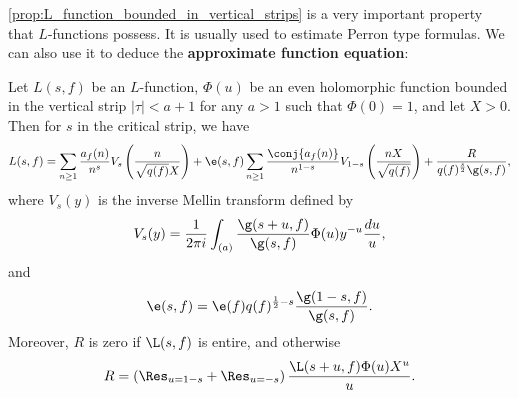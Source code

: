     \cref{prop:L_function_bounded_in_vertical_strips} is a very important property that $L$-functions possess. It is usually used to estimate Perron type formulas. We can also use it to deduce the \textbf{approximate function equation}:

    \begin{theorem}
      Let $L(s,f)$ be an $L$-function, $\Phi(u)$ be an even holomorphic function bounded in the vertical strip $|\tau| < a+1$ for any $a > 1$ such that $\Phi(0) = 1$, and let $X > 0$. Then for $s$ in the critical strip, we have
      \[
        L(s,f) = \sum_{n \ge 1}\frac{a_{f}(n)}{n^{s}}V_{s}\left(\frac{n}{\sqrt{q(f)}X}\right)+\e(s,f)\sum_{n \ge 1}\frac{\conj{a_{f}(n)}}{n^{1-s}}V_{1-s}\left(\frac{nX}{\sqrt{q(f)}}\right)+\frac{R}{q(f)^{\frac{s}{2}}\g(s,f)},
      \]
      where $V_{s}(y)$ is the inverse Mellin transform defined by
      \[
        V_{s}(y) = \frac{1}{2\pi i}\int_{(a)}\frac{\g(s+u,f)}{\g(s,f)}\Phi(u)y^{-u}\frac{du}{u},
      \]
      and
      \[
        \e(s,f) = \e(f)q(f)^{\frac{1}{2}-s}\frac{\g(1-s,f)}{\g(s,f)}.
      \]
      Moreover, $R$ is zero if $\L(s,f)$ is entire, and otherwise
      \[
        R = \left(\Res_{u = 1-s}+\Res_{u = -s}\right)\frac{\L(s+u,f)\Phi(u)X^{u}}{u}.
      \]
    \end{theorem}
